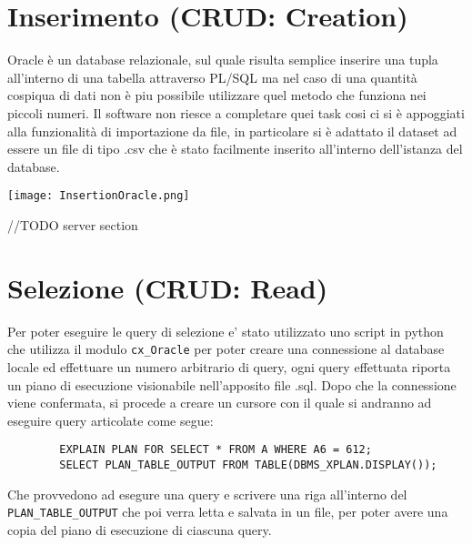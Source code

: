 \section{Inserimento (CRUD: Creation)}


Oracle è un database relazionale, sul quale risulta semplice inserire una tupla all'interno di una tabella attraverso PL/SQL ma nel caso di una quantità
cospiqua di dati non è piu possibile utilizzare quel metodo che funziona nei piccoli numeri. Il software non riesce a completare quei task cosi ci si è 
appoggiati alla funzionalità di importazione da file, in particolare si è adattato il dataset ad essere un file di tipo .csv che è stato facilmente 
inserito all'interno dell'istanza del database.

\begin{center}
    \texttt{[image: InsertionOracle.png]}
\end{center}

//TODO server section


\section{Selezione (CRUD: Read)}

Per poter eseguire le query di selezione e' stato utilizzato uno script in python che utilizza il modulo \verb|cx_Oracle| per poter creare una connessione 
al database locale ed effettuare un numero arbitrario di query, ogni query effettuata riporta un piano di esecuzione visionabile nell'apposito file 
.sql. Dopo che la connessione viene confermata, si procede a creare 
un cursore con il quale si andranno ad eseguire query articolate come segue:

\begin{verbatim}
        EXPLAIN PLAN FOR SELECT * FROM A WHERE A6 = 612;
        SELECT PLAN_TABLE_OUTPUT FROM TABLE(DBMS_XPLAN.DISPLAY());
\end{verbatim}

Che provvedono ad esegure una query e scrivere una riga all'interno del \verb|PLAN_TABLE_OUTPUT| che poi verra letta e salvata 
in un file, per poter avere una copia del piano di esecuzione di ciascuna query.

